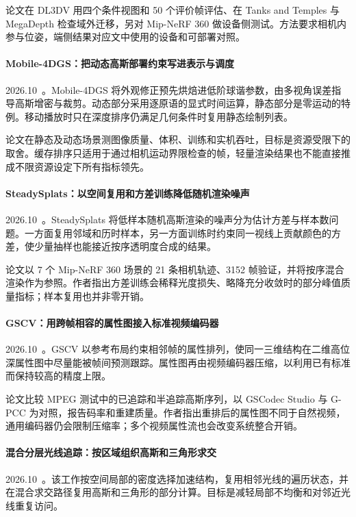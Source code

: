 论文在 DL3DV 用四个条件视图和 50 个评价帧评估、在 Tanks and Temples 与 MegaDepth 检查域外迁移，另对 Mip-NeRF 360 做设备侧测试。方法要求相机内参与位姿，端侧结果对应文中使用的设备和可部署对照。

\paragraph{Mobile-4DGS：把动态高斯部署约束写进表示与调度}
2026.10~\cite{2610_05289}。Mobile-4DGS 将外观修正预先烘焙进低阶球谐参数，由多视角误差指导高斯增密与裁剪。动态部分采用逐原语的显式时间运算，静态部分是零运动的特例。移动播放时只在深度排序仍满足几何条件时复用静态绘制列表。

论文在静态及动态场景测图像质量、体积、训练和实机吞吐，目标是资源受限下的取舍。缓存排序只适用于通过相机运动界限检查的帧，轻量渲染结果也不能直接推成不限资源设定下所有指标领先。

\paragraph{SteadySplats：以空间复用和方差训练降低随机渲染噪声}
2026.10~\cite{2610_05576}。SteadySplats 将低样本随机高斯渲染的噪声分为估计方差与样本数问题。一方面复用邻域和历时样本，另一方面训练时约束同一视线上贡献颜色的方差，使少量抽样也能接近按序透明度合成的结果。

论文以 7 个 Mip-NeRF 360 场景的 21 条相机轨迹、3152 帧验证，并将按序混合渲染作为参照。作者指出方差训练会稀释光度损失、略降充分收敛时的部分峰值质量指标；样本复用也并非零开销。

\paragraph{GSCV：用跨帧相容的属性图接入标准视频编码器}
2026.10~\cite{2610_07795}。GSCV 以参考布局约束相邻帧的属性排列，使同一三维结构在二维高位深属性图中尽量能被帧间预测跟踪。属性图再由视频编码器压缩，以利用已有标准而保持较高的精度上限。

论文比较 MPEG 测试中的已追踪和半追踪高斯序列，以 GSCodec Studio 与 G-PCC 为对照，报告码率和重建质量。作者指出重排后的属性图不同于自然视频，通用编码器仍会限制压缩率；多个视频属性流也会改变系统整合开销。

\paragraph{混合分层光线追踪：按区域组织高斯和三角形求交}
2026.10~\cite{2610_13498}。该工作按空间局部的密度选择加速结构，复用相邻光线的遍历状态，并在混合求交路径复用高斯和三角形的部分计算。目标是减轻局部不均衡和对邻近光线重复访问。


